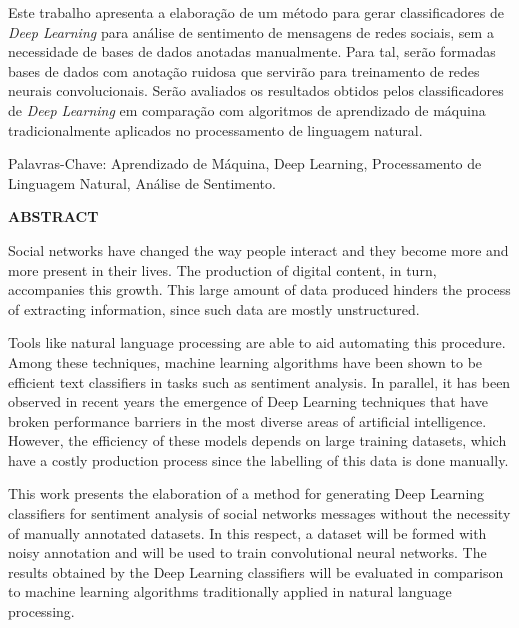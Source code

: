 Este trabalho apresenta a elaboração de um método para gerar classificadores de \textit{Deep Learning} para análise de
sentimento de mensagens de redes sociais, sem a necessidade de bases de dados anotadas manualmente.
Para tal, serão formadas bases de dados com anotação ruidosa que servirão para treinamento de redes neurais
convolucionais.
Serão avaliados os resultados obtidos pelos classificadores de \textit{Deep Learning} em comparação com algoritmos de
aprendizado de máquina tradicionalmente aplicados no processamento de linguagem natural.

\vspace{1.0cm}

\noindent Palavras-Chave: Aprendizado de Máquina, Deep Learning, Processamento de Linguagem Natural, Análise de Sentimento.

\pagebreak

\begin{center}
\textbf{ABSTRACT}
\end{center}
\vspace{0.5cm}

Social networks have changed the way people interact and they become more and more present in their lives.
The production of digital content, in turn, accompanies this growth.
This large amount of data produced hinders the process of extracting information, since such data are mostly
unstructured.

Tools like natural language processing are able to aid automating this procedure.
Among these techniques, machine learning algorithms have been shown to be efficient text classifiers in tasks such as
sentiment analysis.
In parallel, it has been observed in recent years the emergence of Deep Learning techniques that have broken performance
barriers in the most diverse areas of artificial intelligence.
However, the efficiency of these models depends on large training datasets, which have a costly production process since
the labelling of this data is done manually.

This work presents the elaboration of a method for generating Deep Learning classifiers for sentiment analysis of social
networks messages without the necessity of manually annotated datasets.
In this respect, a dataset will be formed with noisy annotation and will be used to train convolutional neural networks.
The results obtained by the Deep Learning classifiers will be evaluated in comparison to machine learning algorithms
traditionally applied in natural language processing.

